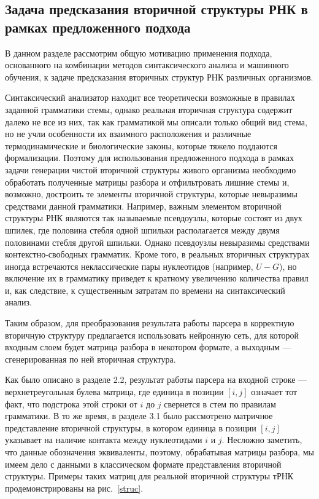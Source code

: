 \documentclass[14pt]{matmex-diploma-custom}
\begin{document}
\subsection{Задача предсказания вторичной структуры РНК в рамках предложенного подхода}
В данном разделе рассмотрим общую мотивацию применения подхода, основанного на комбинации методов синтаксического анализа и машинного обучения, к задаче предсказания вторичных структур РНК различных организмов. 

Синтаксический анализатор находит все теоретически возможные в правилах заданной грамматики стемы, однако реальная вторичная структура содержит далеко не все из них, так как грамматикой мы описали только общий вид стема, но не учли особенности их взаимного расположения и различные термодинамические и биологические законы, которые тяжело поддаются формализации. Поэтому для использования предложенного подхода в рамках задачи генерации чистой вторичной структуры живого организма необходимо обработать полученные матрицы разбора и отфильтровать лишние стемы и, возможно, достроить те элементы вторичной структуры, которые невыразимы средствами данной грамматики. Например, важным элементом вторичной структуры РНК являются так называемые псевдоузлы, которые состоят из двух шпилек, где половина стебля одной шпильки располагается между двумя половинами стебля другой шпильки. Однако псевдоузлы невыразимы средствами контекстно-свободных грамматик. Кроме того, в реальных вторичных структурах иногда встречаются неклассические пары нуклеотидов (например, $U-G$), но включение их в грамматику приведет к кратному увеличению количества правил и, как следствие, к существенным затратам по времени на синтаксический анализ.

Таким образом, для преобразования результата работы парсера в корректную вторичную структуру предлагается использовать нейронную сеть, для которой входным слоем будет матрица разбора в некотором формате, а выходным --- сгенерированная по ней вторичная структура.

Как было описано в разделе 2.2, результат работы парсера на входной строке --- верхнетреугольная булева матрица, где единица в позиции $[i,j]$ означает тот факт, что подстрока этой строки от $i$ до $j$ свернется в стем по правилам грамматики. В то же время, в разделе 3.1 было рассмотрено матричное представление вторичной структуры, в котором единица в позиции $[i,j]$ указывает на наличие контакта между нуклеотидами $i$ и $j$. Несложно заметить, что данные обозначения эквиваленты, поэтому, обрабатывая матрицы разбора, мы имеем дело с данными в классическом формате представления вторичной структуры. Примеры таких матриц для реальной вторичной структуры тРНК продемонстрированы на рис.~\ref{struc}.
\end{document}
